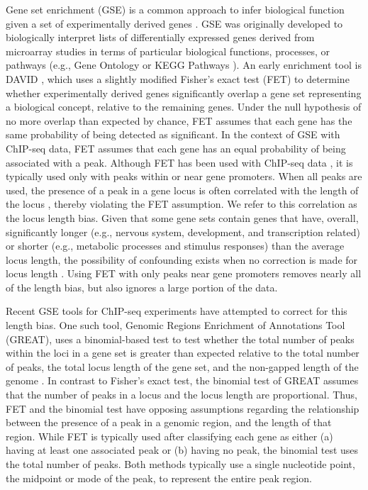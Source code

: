 Gene set enrichment (GSE) is a common approach to infer biological function given a set of experimentally derived genes \cite{Draghici:2003uj}. GSE was originally developed to biologically interpret lists of differentially expressed genes derived from microarray studies \cite{Curtis:2005ck} in terms of particular biological functions, processes, or pathways (e.g., Gene Ontology \cite{Ashburner:2000ja} or KEGG Pathways \cite{Kanehisa:2000jn}). An early enrichment tool is DAVID \cite{Huang:2009gk}, which uses a slightly modified Fisher's exact test (FET) to determine whether experimentally derived genes significantly overlap a gene set representing a biological concept, relative to the remaining genes. Under the null hypothesis of no more overlap than expected by chance, FET assumes that each gene has the same probability of being detected as significant. In the context of GSE with ChIP-seq data, FET assumes that each gene has an equal probability of being associated with a peak. Although FET has been used with ChIP-seq data \cite{Blow:2010bu, Han:2013gv}, it is typically used only with peaks within or near gene promoters. When all peaks are used, the presence of a peak in a gene locus is often correlated with the length of the locus \cite{Ovcharenko:2005br}, thereby violating the FET assumption. We refer to this correlation as the locus length bias. Given that some gene sets contain genes that have, overall, significantly longer (e.g., nervous system, development, and transcription related) or shorter (e.g., metabolic processes and stimulus responses) than the average locus length, the possibility of confounding exists when no correction is made for locus length \cite{Taher:2009ko}. Using FET with only peaks near gene promoters removes nearly all of the length bias, but also ignores a large portion of the data.

Recent GSE tools for ChIP-seq experiments have attempted to correct for this length bias. One such tool, Genomic Regions Enrichment of Annotations Tool (GREAT), uses a binomial-based test to test whether the total number of peaks within the loci in a gene set is greater than expected relative to the total number of peaks, the total locus length of the gene set, and the non-gapped length of the genome \cite{McLean:2010iq}. In contrast to Fisher's exact test, the binomial test of GREAT assumes that the number of peaks in a locus and the locus length are proportional. Thus, FET and the binomial test have opposing assumptions regarding the relationship between the presence of a peak in a genomic region, and the length of that region. While FET is typically used after classifying each gene as either (a) having at least one associated peak or (b) having no peak, the binomial test uses the total number of peaks. Both methods typically use a single nucleotide point, the midpoint or mode of the peak, to represent the entire peak region.

